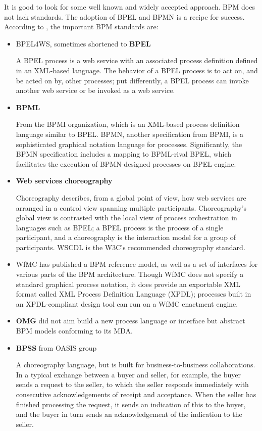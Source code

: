 	It is good to look for some well known and widely accepted approach. BPM does not lack standards. The adoption of
	\gls{BPEL} and \gls{BPMN} is a recipe for success. According to \cite[Ch.~1.3.1]{bpm}, the important BPM standards are:
	
	\begin{itemize}
		\item \gls{BPEL4WS}, sometimes shortened to \textbf{\gls{BPEL}}
		
		A BPEL process is a web service with an associated process definition defined in an XML-based language. The behavior
		of a BPEL process is to act on, and be acted on by, other processes; put differently, a BPEL process can invoke
		another web service or be invoked as a web service.
	  	\item \textbf{\gls{BPML}}
	  
		From the \gls{BPMI} organization, which is an XML-based process definition language similar to BPEL. BPMN, another
	  	specification from BPMI, is a sophisticated graphical notation language for processes. Significantly, the BPMN
	  	specification includes a mapping to BPML-rival BPEL, which facilitates the execution of BPMN-designed processes on
	  	BPEL engine.
	  	\item \textbf{Web services choreography}
	
	  	Choreography describes, from a global point of view, how web services are arranged in a control view spanning
	  	multiple participants. Choreography's global view is contrasted with the local view of process orchestration in
	  	languages such as BPEL; a BPEL process is the process of a single participant, and a choreography is the interaction
	  	model for a group of participants. \gls{WSCDL} is the W3C's recommended choreography standard.
	
	  	\item \gls{WfMC} has published a BPM reference model, as well as a set of interfaces for various parts of the BPM
	  	architecture. Though WfMC does not specify a standard graphical process notation, it does provide an exportable XML
	  	format called XML Process Definition Language (XPDL); processes built in an XPDL-compliant design tool can run on a
	  	WfMC enactment engine.
	  	
	  	\item \textbf{\gls{OMG}} did not aim build a new process language or interface but abstract BPM models conforming to
	  	its \gls{MDA}.
	  	\item \textbf{\gls{BPSS}} from OASIS group

	  	A choreography language, but is built for business-to-business collaborations. In a typical exchange between a buyer
	  	and seller, for example, the buyer sends a request to the seller, to which the seller responds immediately with
	  	consecutive acknowledgements of receipt and acceptance. When the seller has finished processing the request, it
	  	sends an indication of this to the buyer, and the buyer in turn sends an acknowledgement of the indication to the
	  	seller.
	\end{itemize}
	
